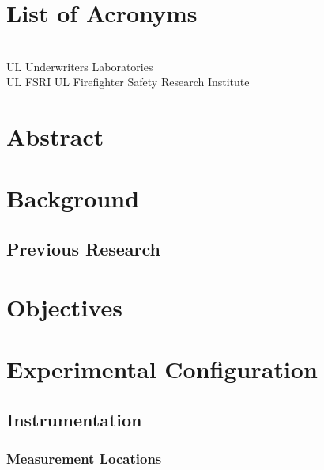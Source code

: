 \documentclass[12pt,oneside]{book}
\begin{document}
\cleardoublepage
{}
{}
\listoffigures

\cleardoublepage
{}
{}
\listoftables

\chapter{List of Acronyms}

\begin{tabbing}
\hspace{1.5in} \= \\
UL 	    \> Underwriters Laboratories \\
UL FSRI \> UL Firefighter Safety Research Institute \\
\end{tabbing}

\newpage

\mainmatter

\chapter*{\centering Abstract}

\newpage

\chapter{Background}

\section{Previous Research}


\chapter{Objectives}


\chapter{Experimental Configuration}
\label{chap:exp_config}

\section{Instrumentation}
\label{sec:instrument}

\subsection{Measurement Locations}
\label{subsec:measure_locs}
\end{document}
